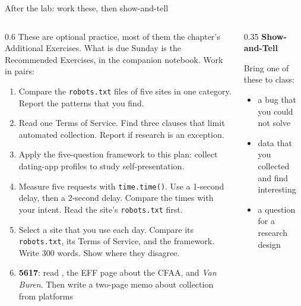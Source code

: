 \documentclass[9pt,aspectratio=169]{beamer}
\begin{document}
\begin{frame}{After the lab: work these, then show-and-tell}
    \begin{columns}[T]
        \begin{column}{0.6\textwidth}
            These are optional practice, most of them the chapter's Additional Exercises. What is due Sunday is the Recommended Exercises, in the companion notebook. Work in pairs:
            \begin{enumerate}\small
                \item Compare the \texttt{robots.txt} files of five sites in one category. Report the patterns that you find.
                \item Read one Terms of Service. Find three clauses that limit automated collection. Report if research is an exception.
                \item Apply the five-question framework to this plan: collect dating-app profiles to study self-presentation.
                \item Measure five requests with \texttt{time.time()}. Use a 1-second delay, then a 2-second delay. Compare the times with your intent. Read the site's \texttt{robots.txt} first.
                \item Select a site that you use each day. Compare its \texttt{robots.txt}, its Terms of Service, and the framework. Write 300 words. Show where they disagree.
                \item[6.] \textbf{5617}: read \textcite{fiesler2020no}, the EFF page about the CFAA, and \textit{Van Buren}. Then write a two-page memo about collection from platforms
            \end{enumerate}
        \end{column}
        \begin{column}{0.35\textwidth}
            \textbf{Show-and-Tell}\\[2pt]
            {\footnotesize Bring one of these to class:\par}
            \begin{itemize}\footnotesize
                \item a bug that you could not solve
                \item data that you collected and find interesting
                \item a question for a research design
            \end{itemize}
        \end{column}
    \end{columns}
\end{frame}
\end{document}
